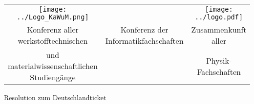 \documentclass[DIV=calc]{scrartcl}
\begin{document}
\begin{table}[]
    \centering
    \addtolength{\leftskip}{-3.2cm}
    \addtolength{\rightskip}{-3cm}
    \vspace{-2cm}
    \begin{tabular}{ccc}
         \texttt{[image: ../Logo\_KaWuM.png]} &  &  \texttt{[image: ../logo.pdf]}\\
         Konferenz aller werkstofftechnischen & Konferenz der Informatikfachschaften & Zusammenkunft aller\\
         und materialwissenschaftlichen Studiengänge & & Physik-Fachschaften \\
    \end{tabular}
    \label{tab:logos}
\end{table}



%     

\begin{center}
  \huge{Resolution zum Deutschlandticket}\vspace{.25\baselineskip}\\
  \normalsize
\end{center}
\vspace{1cm}
\end{document}
